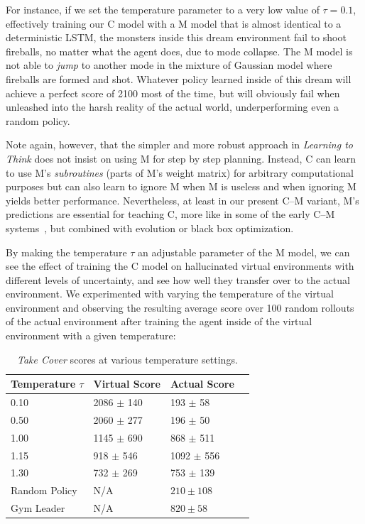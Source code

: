 \documentclass{article}
\begin{document}
For instance, if we set the temperature parameter to a very low value of $\tau=0.1$, effectively training our C model with a M model that is almost identical to a deterministic LSTM, the monsters inside this dream environment fail to shoot fireballs, no matter what the agent does, due to mode collapse. The M model is not able to \textit{jump} to another mode in the mixture of Gaussian model where fireballs are formed and shot. Whatever policy learned inside of this dream will achieve a perfect score of 2100 most of the time, but will obviously fail when unleashed into the harsh reality of the actual world, underperforming even a random policy.

Note again, however, that the simpler and more robust approach in \textit{Learning to Think} does not insist on using M for step by step planning. Instead, C can learn to use M's \textit{subroutines} (parts of M's weight matrix) for arbitrary computational purposes but can also learn to ignore M when M is useless and when ignoring M yields better performance. Nevertheless, at least in our present C--M variant, M's predictions are essential for teaching C, more like in some of the early C--M systems~\cite{s05_making_the_world_differentiable,s05a_cm,s05b_rl}, but combined with evolution or black box optimization.

By making the temperature $\tau$ an adjustable parameter of the M model, we can see the effect of training the C model on hallucinated virtual environments with different levels of uncertainty, and see how well they transfer over to the actual environment. We experimented with varying the temperature of the virtual environment and observing the resulting average score over 100 random rollouts of the actual environment after training the agent inside of the virtual environment with a given temperature:

\begin{table}[ht]
\label{doom_virtual_table}
\vskip -0.0in
\begin{center}
\begin{small}
\begin{sc}
\begin{tabular}{llll}
\toprule
Temperature $\tau$ & Virtual Score & Actual Score \\
\midrule
0.10 & 2086 $\pm$ 140 & 193 $\pm$ 58   \\
0.50 & 2060 $\pm$ 277 & 196 $\pm$ 50   \\
1.00 & 1145 $\pm$ 690 & 868 $\pm$ 511  \\
1.15 & 918 $\pm$ 546  & 1092 $\pm$ 556 \\
1.30 & 732 $\pm$ 269  & 753 $\pm$ 139  \\
\midrule
Random Policy & N/A & $210 \pm 108$ \\
Gym Leader & N/A & $820 \pm 58$ \\
\bottomrule
\end{tabular}
\end{sc}
\end{small}
\end{center}
\vskip -0.1in
\caption{\textit{Take Cover} scores at various temperature settings.}
\vskip -0.1in
\end{table}
\end{document}
